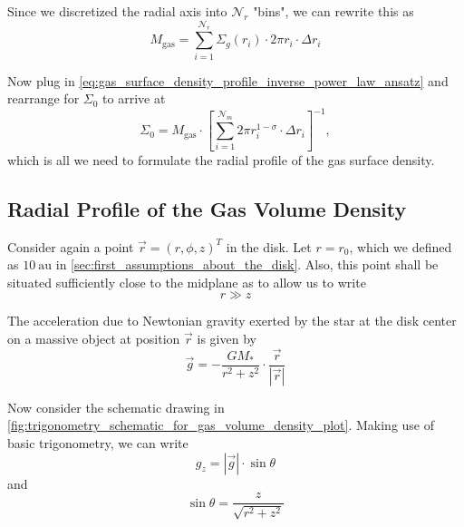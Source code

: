         Since we discretized the radial axis into $\mathcal N_r$ "bins", we can rewrite this as
        \begin{equation}
            M_\text{gas} = \sum_{i=1}^{\mathcal N_r} \Sigma_g(r_i) \cdot 2\pi r_i \cdot \Delta r_i
        \end{equation}

        Now plug in \cref{eq:gas_surface_density_profile_inverse_power_law_ansatz} and 
        rearrange for $\Sigma_0$ to arrive at
        \begin{equation}
            \Sigma_0
                = M_\text{gas} \cdot \left[
                    \sum_{i=1}^{\mathcal N_m} 2\pi r_i^{1-\sigma} \cdot \Delta r_i
                \right]^{-1},
        \end{equation}
        which is all we need to formulate the radial profile of the gas surface density.

    \newpage\subsection{Radial Profile of the Gas Volume Density}
        
        Consider again a point $\vec r=(r,\phi,z)^T$ in the disk. Let $r = r_0$, which we defined 
        as $10 \ \text{au}$ in \cref{sec:first_assumptions_about_the_disk}. Also, this point shall 
        be situated sufficiently close to the midplane as to allow us to write
        \begin{equation}
            \label{eq:r_much_bigger_than_z}
            r\gg z 
        \end{equation}

        The acceleration due to Newtonian gravity exerted by the star at the disk center 
        on a massive object at position $\vec r$ is given by
        \begin{equation}
            \vec g = -\frac{GM_*}{r^2+z^2} \cdot \frac{\vec r}{|\vec r|}
        \end{equation}

        Now consider the schematic drawing in
        \cref{fig:trigonometry_schematic_for_gas_volume_density_plot}.
        Making use of basic trigonometry, we can write
        \begin{equation}
            g_z = |\vec g| \cdot \sin\theta
        \end{equation}
        and
        \begin{equation}
            \sin\theta=\frac{z}{\sqrt{r^2+z^2}}
        \end{equation}

